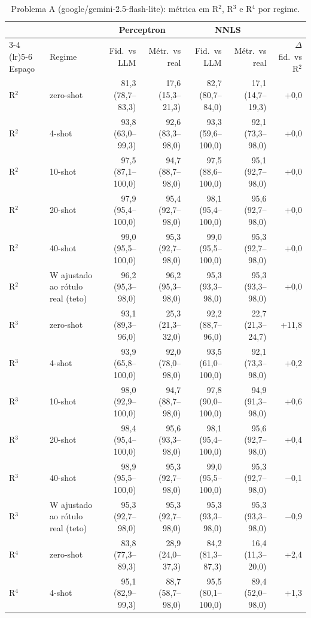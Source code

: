 \begin{table}[htbp]
\centering
\small
\caption{Problema A (google/gemini-2.5-flash-lite): métrica em R$^2$, R$^3$ e R$^4$ por regime.}
\label{tab:bloco1_A_R2_R3_R4_zero_fewshot_flashlite}
\begin{tabular}{llrrrrr}
\toprule
 &  & \multicolumn{2}{c}{Perceptron} & \multicolumn{2}{c}{NNLS} &  \\ \cmidrule(lr){3-4} \cmidrule(lr){5-6}
Espaço & Regime & Fid.\ vs LLM & Métr.\ vs real & Fid.\ vs LLM & Métr.\ vs real & $\Delta$ fid.\ vs R$^2$ \\
\midrule
R$^2$ & zero-shot & 81,3 (78,7–83,3) & 17,6 (15,3–21,3) & 82,7 (80,7–84,0) & 17,1 (14,7–19,3) & +0,0 \\
R$^2$ & 4-shot & 93,8 (63,0–99,3) & 92,6 (83,3–98,0) & 93,3 (59,6–100,0) & 92,1 (73,3–98,0) & +0,0 \\
R$^2$ & 10-shot & 97,5 (87,1–100,0) & 94,7 (88,7–98,0) & 97,5 (88,6–100,0) & 95,1 (92,7–98,0) & +0,0 \\
R$^2$ & 20-shot & 97,9 (95,4–100,0) & 95,4 (92,7–98,0) & 98,1 (95,4–100,0) & 95,6 (92,7–98,0) & +0,0 \\
R$^2$ & 40-shot & 99,0 (95,5–100,0) & 95,3 (92,7–98,0) & 99,0 (95,5–100,0) & 95,3 (92,7–98,0) & +0,0 \\
R$^2$ & W ajustado ao rótulo real (teto) & 96,2 (95,3–98,0) & 96,2 (95,3–98,0) & 95,3 (93,3–98,0) & 95,3 (93,3–98,0) & +0,0 \\
\midrule
R$^3$ & zero-shot & 93,1 (89,3–96,0) & 25,3 (21,3–32,0) & 92,2 (88,7–96,0) & 22,7 (21,3–24,7) & +11,8 \\
R$^3$ & 4-shot & 93,9 (65,8–100,0) & 92,0 (78,0–98,0) & 93,5 (61,0–100,0) & 92,1 (73,3–98,0) & +0,2 \\
R$^3$ & 10-shot & 98,0 (92,9–100,0) & 94,7 (88,7–98,0) & 97,8 (90,0–100,0) & 94,9 (91,3–98,0) & +0,6 \\
R$^3$ & 20-shot & 98,4 (95,4–100,0) & 95,6 (93,3–98,0) & 98,1 (95,4–100,0) & 95,6 (92,7–98,0) & +0,4 \\
R$^3$ & 40-shot & 98,9 (95,5–100,0) & 95,3 (92,7–98,0) & 99,0 (95,5–100,0) & 95,3 (92,7–98,0) & $-$0,1 \\
R$^3$ & W ajustado ao rótulo real (teto) & 95,3 (92,7–98,0) & 95,3 (92,7–98,0) & 95,3 (93,3–98,0) & 95,3 (93,3–98,0) & $-$0,9 \\
\midrule
R$^4$ & zero-shot & 83,8 (77,3–89,3) & 28,9 (24,0–37,3) & 84,2 (81,3–87,3) & 16,4 (11,3–20,0) & +2,4 \\
R$^4$ & 4-shot & 95,1 (82,9–99,3) & 88,7 (58,7–98,0) & 95,5 (80,1–100,0) & 89,4 (52,0–98,0) & +1,3 \\

\end{tabular}
\end{table}
